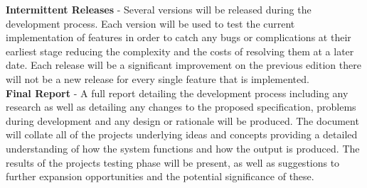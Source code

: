 \documentclass[10pt,a4paper]{article}
\begin{document}
\noindent
\textbf{Intermittent Releases} - Several versions will be released during the development process. Each version will be used to test the current implementation of features in order to catch any bugs or complications at their earliest stage reducing the complexity and the costs of resolving them at a later date. Each release will be a significant improvement on the previous edition there will not be a new release for every single feature that is implemented. \\

\noindent
\textbf{Final Report} - A full report detailing the development process including any research as well as detailing any changes to the proposed specification, problems during development and any design or rationale will be produced. The document will collate all of the projects underlying ideas and concepts providing a detailed understanding of how the system functions and how the output is produced. The results of the projects testing phase will be present, as well as suggestions to further expansion opportunities and the potential significance of these.\\

\nocite{*}


\end{document}
